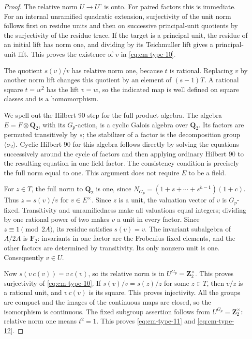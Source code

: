 \begin{proof}
The relative norm \(U\to U^c\) is onto. For paired factors this
is immediate. For an internal unramified quadratic extension,
surjectivity of the unit norm follows first on residue units and
then on successive principal-unit quotients by the surjectivity
of the residue trace. If the target is a principal unit, the
residue of an initial lift has norm one, and dividing by its
Teichmuller lift gives a principal-unit lift. This proves the
existence of \(v\) in \eqref{eq:cm-type-10}.

The quotient \(s(v)/v\) has relative norm one, because \(t\)
is rational. Replacing \(v\) by another norm lift changes this
quotient by an element of \((s-1)T\). A rational square \(t=w^2\)
has the lift \(v=w\), so the indicated map is well defined on
square classes and is a homomorphism.

We spell out the Hilbert 90 step for the full product algebra.
The algebra \(E=F\otimes\mathbf Q_2\), with its \(G_p\)-action,
is a cyclic Galois algebra over \(\mathbf Q_2\). Its factors are
permuted transitively by \(s\); the stabilizer of a factor is the
decomposition group \(\langle\sigma_2\rangle\). Cyclic Hilbert
90 for this algebra follows directly by solving the equations
successively around the cycle of factors and then applying
ordinary Hilbert 90 to the resulting equation in one field
factor. The consistency condition is precisely the full norm
equal to one. This argument does not require \(E\) to be a field.

For \(z\in T\), the full norm to \(\mathbf Q_2\) is one,
since \(N_{G_p}=(1+s+\cdots+s^{h-1})(1+c)\). Thus
\(z=s(v)/v\) for \(v\in E^\times\). Since \(z\) is a unit,
the valuation vector of \(v\) is \(G_p\)-fixed. Transitivity
and unramifiedness make all valuations equal integers; dividing
by one rational power of two makes \(v\) a unit in every factor.
Since \(z\equiv1\pmod{2A}\), its residue satisfies \(s(v)=v\).
The invariant subalgebra of \(A/2A\) is \(\mathbf F_2\):
invariants in one factor are the Frobenius-fixed elements, and
the other factors are determined by transitivity. Its only
nonzero unit is one. Consequently \(v\in U\).

Now \(s(v\,c(v))=v\,c(v)\), so its relative norm is in
\(U^{G_p}=\mathbf Z_2^\times\). This proves surjectivity of
\eqref{eq:cm-type-10}. If \(s(v)/v=s(z)/z\) for some \(z\in T\), then
\(v/z\) is a rational unit, and \(v\,c(v)\) is its square.
This proves injectivity. All the groups are compact and the
images of the continuous maps are closed, so the isomorphism
is continuous. The fixed subgroup assertion follows from
\(U^{G_p}=\mathbf Z_2^\times\): relative norm one means \(t^2=1\).
This proves \eqref{eq:cm-type-11} and \eqref{eq:cm-type-12}.


\end{proof}
